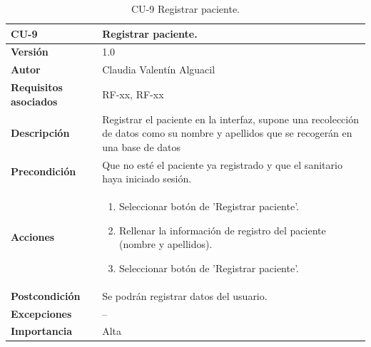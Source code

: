 \begin{table}[p]
	\centering
	\begin{tabularx}{\linewidth}{ p{} p{} }
		\toprule
		\textbf{CU-9}    & \textbf{Registrar paciente.}\\
		\toprule
		\textbf{Versión}              & 1.0    \\
		\textbf{Autor}                & Claudia Valentín Alguacil \\
		\textbf{Requisitos asociados} & RF-xx, RF-xx \\
		\textbf{Descripción}          & Registrar el paciente en la interfaz, supone una recolección de datos como su nombre y apellidos que se recogerán en una base de datos \\
		\textbf{Precondición}  & Que no esté el paciente ya registrado y que el sanitario haya iniciado sesión.\\
		\textbf{Acciones}             &
		\begin{enumerate}
			\def\labelenumi{\arabic{enumi}.}
			\tightlist
                \item Seleccionar botón de 'Registrar paciente'.
                \item Rellenar la información de registro del paciente (nombre y apellidos).
                \item Seleccionar botón de 'Registrar paciente'.
		\end{enumerate}\\
		\textbf{Postcondición} &  Se podrán registrar datos del usuario. \\
		\textbf{Excepciones} & -- \\
		\textbf{Importancia}          & Alta \\
		\bottomrule
	\end{tabularx}
	\caption{CU-9 Registrar paciente.}
\end{table}



